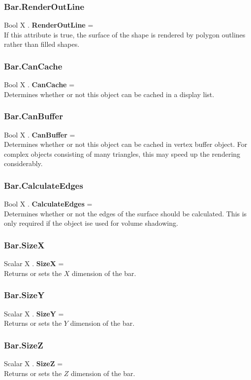 \subsubsection{Bar.RenderOutLine \label{F:Bar:RenderOutLine}}
Bool X . \textbf{RenderOutLine} = \\
If this attribute is true, the surface of the shape is rendered by polygon outlines rather than filled shapes.

\subsubsection{Bar.CanCache \label{F:Bar:CanCache}}
Bool X . \textbf{CanCache} = \\
Determines whether or not this object can be cached in a display list.

\subsubsection{Bar.CanBuffer \label{F:Bar:CanBuffer}}
Bool X . \textbf{CanBuffer} = \\
Determines whether or not this object can be cached in vertex buffer object. For complex objects consisting of many triangles, this may speed up the rendering considerably.

\subsubsection{Bar.CalculateEdges \label{F:Bar:CalculateEdges}}
Bool X . \textbf{CalculateEdges} = \\
Determines whether or not the edges of the surface should be calculated. This is only required if the object ise used for volume shadowing.

\subsubsection{Bar.SizeX \label{F:Bar:SizeX}}
Scalar X . \textbf{SizeX} = \\
Returns or sets the $X$ dimension of the bar.

\subsubsection{Bar.SizeY \label{F:Bar:SizeY}}
Scalar X . \textbf{SizeY} = \\
Returns or sets the $Y$ dimension of the bar.

\subsubsection{Bar.SizeZ \label{F:Bar:SizeZ}}
Scalar X . \textbf{SizeZ} = \\
Returns or sets the $Z$ dimension of the bar.

